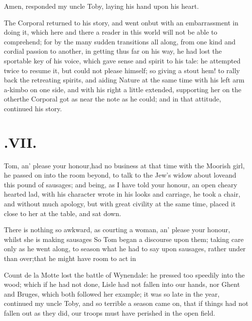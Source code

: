 \documentclass{article}
\begin{document}
Amen, responded my uncle Toby,\break
laying his hand upon his heart.

The Corporal returned to his story, and went on\tsh but with an embar\-rassment in
doing it, which here and there a reader in this world will not be able to
comprehend; for by the many sudden transitions all along, from one kind and cordial
passion to another, in getting thus far on his way, he had lost the sportable key of
his voice, which gave sense and spirit to his tale: he attempted twice to resume it,
but could not please himself; so giving a stout hem! to rally back the retreating
spirits, and aiding Nature at the same time with his left arm a-kimbo on one side,
and with his right a little extended, supporting her on the other\tsk the Corporal got
as near the note as he could; and in that attitude, continued his story.

\vfill{}\eject
\null{}\baselineskip
\section{.\enspace VII.}

 Tom, an’ please your honour,\break had no business at that time with the
Moorish girl, he passed on into the room beyond, to talk to the Jew’s widow
about love\tsh and this pound of sausages; and being, as I have told your
honour,\break
an open cheary hearted lad, with his character wrote in his looks and carriage, he
took a chair, and without much apology, but with great civility at the same time,
placed it close to her at the table, and sat down.

There is nothing so awkward, as courting a woman, an’
please your honour, whilst she is making sausages\tsh\break
So Tom began a discourse upon them;\etp{}
taking care only as he went along, to season what he had to say upon sausages,
rather under than over;\tsh that he might have room to act in\tsh

\noindent
{}
Count de la Motte lost the battle of Wynendale: he
pressed too speedily into the wood; which if he had not done, Lisle had not fallen
into our hands, nor Ghent and Bruges, which both followed her example; it was so
late in the year, continued my uncle Toby, and so terrible a season came on, that if
things had not fallen out as they did, our troops must have perished in the open
field.\tsh
\end{document}
